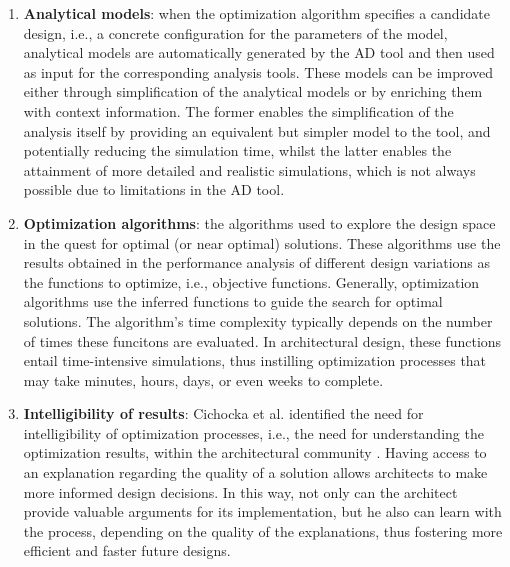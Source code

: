 \begin{enumerate}
\item \textbf{Analytical models}: when the optimization algorithm specifies a candidate design, i.e., a concrete configuration for the parameters of the model, analytical models are automatically generated by the \ac{AD} tool and then used as input for the corresponding analysis tools. These models can be improved either through simplification of the analytical models or by enriching them with context information. The former enables the simplification of the analysis itself by providing an equivalent but simpler model to the tool, and potentially reducing the simulation time, whilst the latter enables the attainment of more detailed and realistic simulations, which is not always possible due to limitations in the \ac{AD} tool. 

\item \textbf{Optimization algorithms}: the algorithms used to explore the design space in the quest for optimal (or near optimal) solutions. These algorithms use the results obtained in the performance analysis of different design variations as the functions to optimize, i.e., objective functions. Generally, optimization algorithms use the inferred functions to guide the search for optimal solutions. The algorithm's time complexity typically depends on the number of times these funcitons are evaluated. In architectural design, these functions entail time-intensive simulations, thus instilling optimization processes that may take minutes, hours, days, or even weeks to complete.

\item \textbf{Intelligibility of results}: Cichocka et al. identified the need for intelligibility of optimization processes, i.e., the need for understanding the optimization results, within the architectural community \cite{Cichocka2017SURVEY}. Having access to an explanation regarding the quality of a solution allows architects to make more informed design decisions. In this way, not only can the architect provide valuable arguments for its implementation, but he also can learn with the process, depending on the quality of the explanations, thus fostering more efficient and faster future designs. 


\end{enumerate}
